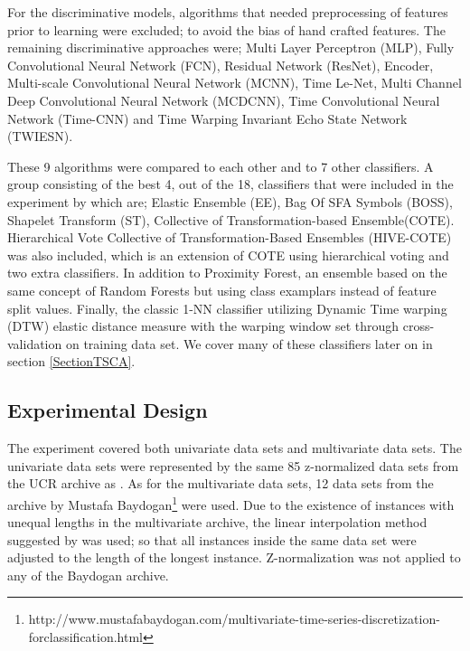 For the discriminative models, algorithms that needed preprocessing of features prior to learning were excluded; to avoid the bias of hand crafted features.
The remaining discriminative approaches were; Multi Layer Perceptron (MLP), Fully Convolutional Neural Network (FCN), Residual Network (ResNet), Encoder, Multi-scale Convolutional Neural Network (MCNN),
Time Le-Net, Multi Channel Deep Convolutional Neural Network (MCDCNN), Time Convolutional Neural Network (Time-CNN) and Time Warping Invariant Echo State Network (TWIESN).

These 9 algorithms were compared to each other and to 7 other classifiers.
A group consisting of the best 4, out of the 18, classifiers that were included in the experiment by \cite{bagnall2017great} which are; Elastic Ensemble (EE), Bag Of SFA Symbols (BOSS), Shapelet Transform (ST), Collective of Transformation-based Ensemble(COTE).
Hierarchical Vote Collective of Transformation-Based Ensembles (HIVE-COTE) was also included, which is an extension of COTE using hierarchical voting and two extra classifiers.
In addition to Proximity Forest, an ensemble based on the same concept of Random Forests but using class examplars instead of feature split values.
Finally, the classic 1-NN classifier utilizing Dynamic Time warping (DTW) elastic distance measure with the warping window set through cross-validation on training data set.
We cover many of these classifiers later on in section \ref{SectionTSCA}.

\subsection{Experimental Design}
\label{subsectionDeepLearningReviewExperiment}
The experiment covered both univariate data sets and multivariate data sets. The univariate data sets were represented by the same 85 z-normalized data sets from the UCR archive as \cite{bagnall2017great}.
As for the multivariate data sets, 12 data sets from the archive by Mustafa Baydogan\footnote{http://www.mustafabaydogan.com/multivariate-time-series-discretization-forclassification.html}
were used. Due to the existence of instances with unequal lengths in the multivariate archive, the linear interpolation method suggested by \cite{ratanamahatana2005three} was used;
so that all instances inside the same data set were adjusted to the length of the longest instance. Z-normalization was not applied to any of the Baydogan archive.


